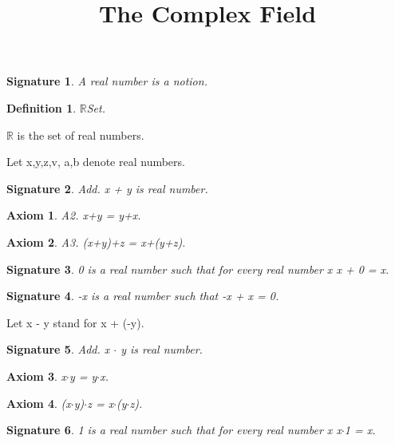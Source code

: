 \documentclass{article}
\newenvironment{forthel}{\begin{leftbar}}{\end{leftbar}}
\newtheorem{axiom}{Axiom}
\newtheorem{definition}{Definition}
\newtheorem{signature}{Signature}
\begin{document}
\title{The Complex Field}

\maketitle

\begin{forthel}
[set/-s] [element/-s] [number/-s] [integer/-s]

\begin{signature} A real number is a notion.

\end{signature}

\begin{definition} $\mathbb{R}$Set.

\end{definition}
$\mathbb{R}$ is the set of real numbers.

Let x,y,z,v, a,b denote real numbers.



\begin{signature} Add. x + y is real number.

\end{signature}
\begin{axiom} A2. x+y = y+x.

\end{axiom}
\begin{axiom} A3. (x+y)+z = x+(y+z).

\end{axiom}
\begin{signature} 0 is a real number such that for every real number x x + 0 = x.

\end{signature}
\begin{signature} -x is a real number such that -x + x = 0.

\end{signature}

Let x - y stand for x + (-y).

\begin{signature} Add. x $\cdot$ y is real number.

\end{signature}
\begin{axiom} x$\cdot$y = y$\cdot$x.

\end{axiom}
\begin{axiom} (x$\cdot$y)$\cdot$z = x$\cdot$(y$\cdot$z).

\end{axiom}
\begin{signature} 1 is a real number such that for every real number x x$\cdot$1 = x.


\end{signature}
\end{forthel}
\end{document}
